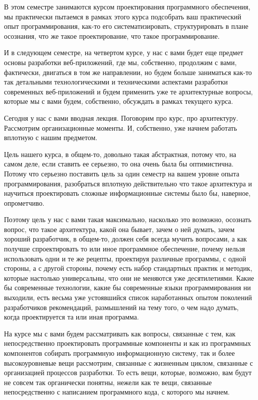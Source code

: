 В этом семестре занимаются курсом проектирования программного обеспечения, мы практически пытаемся в рамках этого курса подсобрать ваш практический опыт программирования, как-то его систематизировать, структурировать в плане осознания, что же такое проектирование, что такое программирование.

И в следующем семестре, на четвертом курсе, у нас с вами будет еще предмет основы разработки веб-приложений, где мы, собственно, продолжим с вами, фактически, двигаться в том же направлении, но будем больше заниматься как-то так детальными технологическими и техническими аспектами разработки современных веб-приложений и будем применить уже те архитектурные вопросы, которые мы с вами будем, собственно, обсуждать в рамках текущего курса.

Сегодня у нас с вами вводная лекция. Поговорим про курс, про архитектуру. Рассмотрим организационные моменты. И, собственно, уже начнем работать вплотную с нашим предметом.

Цель нашего курса, в общем-то, довольно такая абстрактная, потому что, на самом деле, если ставить ее серьезно, то она очень была бы оптимистична. Потому что серьезно поставить цель за один семестр на вашем уровне опыта программирования, разобраться вплотную действительно что такое архитектура и научиться проектировать сложные информационные системы было бы, наверное, опрометчиво.

Поэтому цель у нас с вами такая максимально, насколько это возможно, осознать вопрос, что такое архитектура, какой она бывает, зачем о ней думать, зачем хороший разработчик, в общем-то, должен себя всегда мучить вопросами, а как получше спроектировать то или иное программное обеспечение, почему нельзя использовать одни и те же рецепты, проектируя различные программы, с одной стороны, а с другой стороны, почему есть набор стандартных практик и методик, которые настолько универсальны, что они не меняются уже десятилетиями. Какие бы современные технологии, какие бы современные языки программирования ни выходили, есть весьма уже устоявшийся список наработанных опытом поколений разработчиков рекомендаций, размышлений на тему того, о чем надо думать, когда проектируется та или иная программа. 

На курсе мы с вами будем рассматривать как вопросы, связанные с тем, как непосредственно проектировать программные компоненты и как из программных компонентов собирать программную информационную систему, так и более высокоуровневые вещи рассмотрим, связанные с жизненным циклом, связанные с организацией процессов разработки. То есть вещи, которые, возможно, вам будут не совсем так органически понятны, нежели как те вещи, связанные непосредственно с написанием программного кода, с которого мы начнем.

